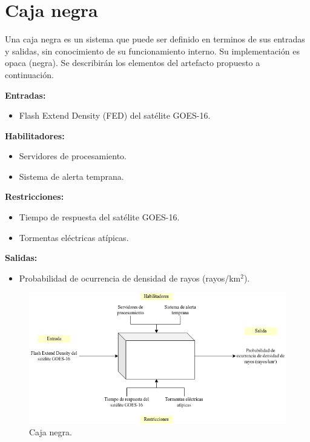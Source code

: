\section{Caja negra}
Una caja negra es un sistema que puede ser definido en terminos de sus entradas 
y salidas, sin conocimiento de su funcionamiento interno. Su implementación es 
opaca (negra). Se describirán los elementos del artefacto propuesto a 
continuación.

\textbf{Entradas:}
\begin{itemize}
  \item Flash Extend Density (FED) del satélite GOES-16.
\end{itemize}

\textbf{Habilitadores:}
\begin{itemize}
  \item Servidores de procesamiento.
  \item Sistema de alerta temprana.
\end{itemize}

\textbf{Restricciones:}
\begin{itemize}
  \item Tiempo de respuesta del satélite GOES-16.
  \item Tormentas eléctricas atípicas.
\end{itemize}


\textbf{Salidas:}
\begin{itemize}
  \item Probabilidad de ocurrencia de densidad de rayos (rayos/km$^2$).
\end{itemize}

\begin{figure}[H]
  \centering
  \includegraphics[width=14cm]{E_IMAGENES/4_Aporte/CajaNegra.png}
  \caption{
    Caja negra.
  }
  \label{fig:cajanegra}
\end{figure}